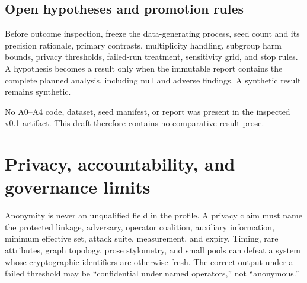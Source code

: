 \documentclass[11pt]{article}
\begin{document}
\subsection{Open hypotheses and promotion rules}







Before outcome inspection, freeze the data-generating process, seed count and its
precision rationale, primary contrasts, multiplicity handling, subgroup harm bounds,
privacy thresholds, failed-run treatment, sensitivity grid, and stop rules. A
hypothesis becomes a result only when the immutable report contains the complete
planned analysis, including null and adverse findings. A synthetic result remains
synthetic.

\begin{evidencegate}
No A0--A4 code, dataset, seed manifest, or report was present in the inspected v0.1
artifact. This draft therefore contains no comparative result prose.
\end{evidencegate}

\section{Privacy, accountability, and governance limits}

Anonymity is never an unqualified field in the profile. A privacy claim must name
the protected linkage, adversary, operator coalition, auxiliary information,
minimum effective set, attack suite, measurement, and expiry. Timing, rare
attributes, graph topology, prose stylometry, and small pools can defeat a system
whose cryptographic identifiers are otherwise fresh. The correct output under a
failed threshold may be ``confidential under named operators,'' not ``anonymous.''
\end{document}
